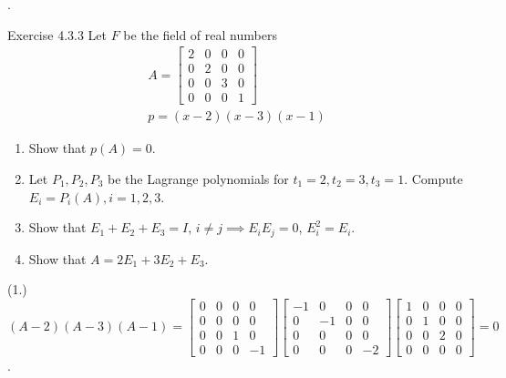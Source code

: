 \documentclass[8pt]{beamer}
\begin{document}
\begin{frame}{.}
    \begin{block}{Exercise 4.3.3}
        Let $F$ be the field of real numbers 
        \[
            \begin{gathered}
                A = \begin{bmatrix}
                    2 & 0 & 0 & 0 \\ 0 & 2 & 0 & 0 \\ 0 & 0 & 3 & 0 \\ 0 & 0 & 0 & 1
                \end{bmatrix} \\
                p = (x-2)(x-3)(x-1)
            \end{gathered}
        \]
        \begin{enumerate}
            \item Show that $p(A) = 0$.
            \item Let $P_1, P_2, P_3$ be the Lagrange polynomials for $t_1 =2, t_2 = 3, t_3 = 1$.
            Compute $E_i = P_i(A), i=1,2,3$.
            \item Show that $E_1 + E_2 + E_3 = I$, $i\neq j \implies E_i E_j = 0$, $E_i^2 = E_i$.
            \item Show that $A = 2E_1 + 3E_2 + E_3$.
        \end{enumerate}
    \end{block}

    (1.) $(A-2)(A-3)(A-1) = \begin{bmatrix}
        0 & 0 & 0 & 0 \\ 0 & 0 & 0 & 0 \\ 0 & 0 & 1 & 0 \\ 0 & 0 & 0 & -1
    \end{bmatrix} \begin{bmatrix}
        -1 &0 & 0 & 0 \\ 0 & -1 & 0 & 0 \\ 0 & 0 & 0 & 0 \\ 0 & 0 & 0 & -2
    \end{bmatrix} \begin{bmatrix}
    1 & 0 & 0 & 0 \\ 0 & 1 & 0 & 0 \\ 0 & 0 & 2 & 0 \\ 0 & 0 & 0 & 0
    \end{bmatrix} = 0$.
\end{frame}
\end{document}
